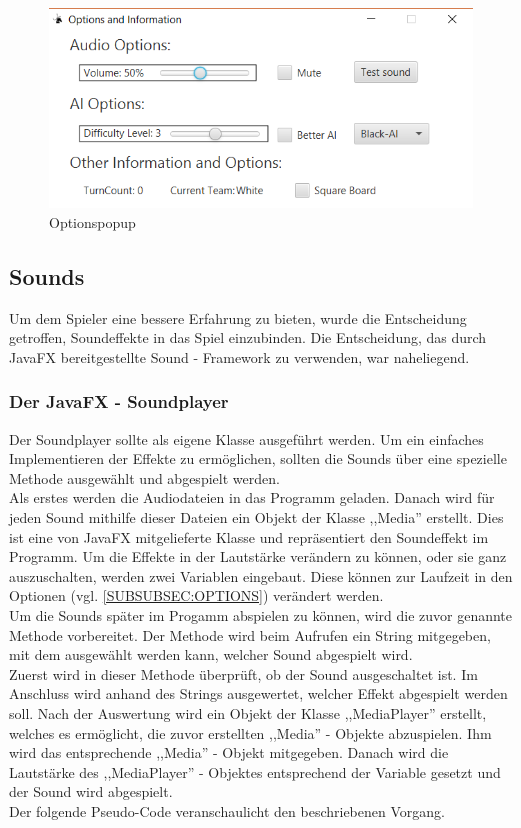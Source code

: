 \documentclass[12pt,a4paper]{article}
\begin{document}
\begin{figure}[H]
  \centering
   	\includegraphics[width=14cm]{graphics/Menu.png}
  \caption{Optionspopup }
  \label{fig:options}
\end{figure}

\newpage
\subsection{Sounds}
Um dem Spieler eine bessere Erfahrung zu bieten, wurde die Entscheidung getroffen, Soundeffekte in das Spiel einzubinden. Die Entscheidung, das durch JavaFX bereitgestellte Sound - Framework zu verwenden, war naheliegend.

\subsubsection{Der JavaFX - Soundplayer}
Der Soundplayer sollte als eigene Klasse ausgeführt werden. Um ein einfaches Implementieren der Effekte zu ermöglichen, sollten die Sounds über eine spezielle Methode ausgewählt und abgespielt werden. \\
Als erstes werden die Audiodateien in das Programm geladen. Danach wird für jeden Sound  mithilfe dieser Dateien ein Objekt der Klasse ,,Media'' erstellt. Dies ist eine von JavaFX mitgelieferte Klasse und repräsentiert den Soundeffekt im Programm. Um die Effekte in der Lautstärke verändern zu können, oder sie ganz auszuschalten, werden zwei Variablen eingebaut. Diese können zur Laufzeit in den Optionen (vgl. \ref{SUBSUBSEC:OPTIONS}) verändert werden.\\
Um die Sounds später im Progamm abspielen zu können, wird die zuvor genannte Methode vorbereitet. Der Methode wird beim Aufrufen ein String mitgegeben, mit dem ausgewählt werden kann, welcher Sound abgespielt wird.\\
Zuerst wird in dieser Methode überprüft, ob der Sound ausgeschaltet ist. Im Anschluss wird anhand des Strings ausgewertet, welcher Effekt abgespielt werden soll. Nach der Auswertung wird ein Objekt der Klasse ,,MediaPlayer'' erstellt, welches es ermöglicht, die zuvor erstellten ,,Media'' - Objekte abzuspielen. Ihm wird das entsprechende ,,Media'' - Objekt mitgegeben. Danach wird die Lautstärke des ,,MediaPlayer'' - Objektes entsprechend der Variable gesetzt und der Sound wird abgespielt. \\
Der folgende Pseudo-Code veranschaulicht den beschriebenen Vorgang.
\end{document}
